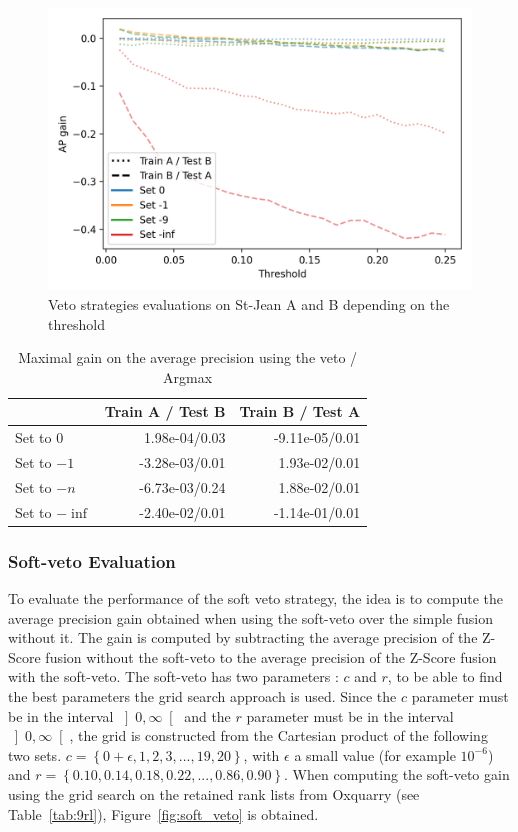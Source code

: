 \begin{figure}
  \caption{Veto strategies evaluations on St-Jean A and B depending on the threshold}
  \label{fig:veto}
  \includegraphics[width=\linewidth]{img/veto.png}
\end{figure}

\begin{table}
  \centering
  \caption{Maximal gain on the average precision using the veto / Argmax}
  \label{tab:veto}
  \begin{tabular}{l r r}
    \toprule
                   & Train A / Test B & Train B / Test A \\
    \midrule
    Set to $0$     & 1.98e-04/0.03 & -9.11e-05/0.01 \\
    Set to $-1$    & -3.28e-03/0.01 & 1.93e-02/0.01 \\
    Set to $-n$    & -6.73e-03/0.24 & 1.88e-02/0.01 \\
    Set to $-\inf$ & -2.40e-02/0.01 & -1.14e-01/0.01 \\
    \bottomrule
  \end{tabular}
\end{table}

\subsubsection{Soft-veto Evaluation}

To evaluate the performance of the soft veto strategy, the idea is to compute the average precision gain obtained when using the soft-veto over the simple fusion without it.
The gain is computed by subtracting the average precision of the Z-Score fusion without the soft-veto to the average precision of the Z-Score fusion with the soft-veto.
The soft-veto has two parameters : $c$ and $r$, to be able to find the best parameters the grid search approach is used.
Since the $c$ parameter must be in the interval $\left]0, \infty\right[$ and the $r$ parameter must be in the interval $\left]0, \infty\right[$, the grid is constructed from the Cartesian product of the following two sets.
$c = \left\{0 + \epsilon, 1, 2, 3, ..., 19, 20\right\}$, with $\epsilon$ a small value (for example $10^{-6}$) and $r = \left\{0.10, 0.14, 0.18, 0.22, ..., 0.86, 0.90\right\}$.
When computing the soft-veto gain using the grid search on the retained rank lists from Oxquarry (see Table~\ref{tab:9rl}), Figure~\ref{fig:soft_veto} is obtained.

